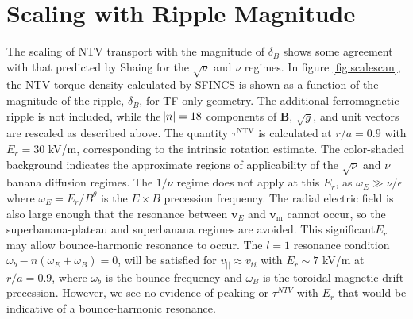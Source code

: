 \documentclass[aip, pop, preprint]{revtex4-1}
\numberwithin{figure}{section}
\numberwithin{equation}{section}
\begin{document}
\section{Scaling with Ripple Magnitude}\label{scaling}
The scaling of NTV transport with the magnitude of $\delta_B$ shows some agreement with that predicted by Shaing for the $\sqrt{\nu}$ and $\nu$ regimes.\cite{Shaing2008, Shaing2009} In figure \ref{fig:scalescan}, the NTV torque density calculated by SFINCS is shown as a function of the magnitude of the ripple, $\delta_B$, for TF only geometry. The additional ferromagnetic ripple is not included, while the $\abs{n}=18$ components of $\bm{B}$, $\sqrt{g}$, and unit vectors are rescaled as described above. The quantity $\tau^{\text{NTV}}$ is calculated at $r/a = 0.9$ with $E_r = 30$ kV/m, corresponding to the intrinsic rotation estimate. The color-shaded background indicates the approximate regions of applicability of the $\sqrt{\nu}$ and $\nu$ banana diffusion regimes. The $1/\nu$ regime\cite{Shaing2003} does not apply at this $E_r$, as $\omega_E \gg \nu/\epsilon$ where $\omega_E = E_r/B^{\theta}$ is the $E\times B$ precession frequency. The radial electric field is also large enough that the resonance between $\bm{v}_{E}$ and $\bm{v}_{\text{m}}$ cannot occur, so the superbanana-plateau \cite{Shaing2009_sbp} and superbanana \cite{Shaing2009_sb} regimes are avoided. This significant$E_r$ may allow bounce-harmonic resonance to occur. The $l =1$ resonance condition $\omega_b - n(\omega_E + \omega_B) = 0$, will be satisfied for $v_{||} \approx v_{ti}$ with $E_r \sim 7$ kV/m at $r/a = 0.9$, where $\omega_b$ is the bounce frequency and $\omega_B$ is the toroidal magnetic drift precession.\cite{Park2009} However, we see no evidence of peaking or $\tau^{NTV}$ with $E_r$ that would be indicative of a bounce-harmonic resonance.
\end{document}
